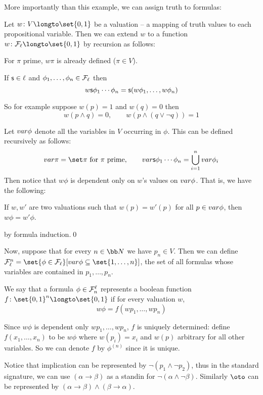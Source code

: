 More importantly than this example, we can assign truth to formulas:

\bdefn

    Let $w\colon V\longto\set{0,1}$ be a {\emphcolor valuation} -- a mapping of truth values to
    each propositional variable.
    Then we can extend $w$ to a function $w\colon{\cal F}_\ell\longto\set{0,1}$ by recursion as
    follows:
    \benum
        \item For $\pi$ prime, $w\pi$ is already defined ($\pi\in V$).
        \item If ${\sf s}\in\ell$ and $\phi_1,\dots,\phi_n\in{\cal F}_\ell$ then
        $$ w{\sf s}\phi_1\cdots\phi_n = {\sf s}(w\phi_1,\dots,w\phi_n) $$
    \eenum

\edefn

So for example suppose $w(p)=1$ and $w(q)=0$ then
$$ w(p\land q) = 0,\qquad w(p\land(q\lor\neg q)) = 1 $$

Let ${\sl var}\phi$ denote all the variables in $V$ occurring in $\phi$.
This can be defined recursively as follows:
$$ \var\pi=\set\pi\hbox{ for $\pi$ prime},\qquad
\var\s s\phi_1\cdots\phi_n = \bigcup_{i=1}^n\var\phi_i $$
Then notice that $w\phi$ is dependent only on $w$'s values on ${\sl var}\phi$.
That is, we have the following:

\blemm

    If $w,w'$ are two valuations such that $w(p)=w'(p)$ for all $p\in{\sl var}\phi$, then
    $w\phi=w'\phi$.

\elemm

\Proof by formula induction.\qed

Now, suppose that for every $n\in{\bb N}$ we have $p_n\in V$.
Then we can define ${\cal F}^n_\ell=\set{\phi\in{\cal F}_\ell}[\var\phi\subseteq\set{1,\dots,n}]$,
the set of all formulas whose variables are contained in $p_1,\dots,p_n$.

\bdefn

    We say that a formula $\phi\in{\cal F}^\ell_n$ {\emphcolor represents} a boolean function
    $f\colon\set{0,1}^n\longto\set{0,1}$ if for every valuation $w$,
    $$ w\phi = f(wp_1,\dots,wp_n) $$

\edefn

Since $w\phi$ is dependent only $wp_1,\dots,wp_n$, $f$ is uniquely determined: define
$f(x_1,\dots,x_n)$ to be $w\phi$ where $w(p_i)=x_i$ and $w(p)$ arbitrary for all other variables.
So we can denote $f$ by $\phi^{(n)}$ since it is unique.

Notice that implication can be represented by $\neg(p_1\land\neg p_2)$, thus in the standard
signature, we can use $(\alpha\to\beta)$ as a standin for $\neg(\alpha\land\neg\beta)$.
Similarly $\oto$ can be represented by $(\alpha\to\beta)\land(\beta\to\alpha)$.

